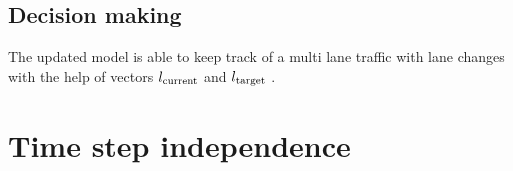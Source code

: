 		\subsection*{Decision making}
		The updated model is able to keep track of a multi lane traffic with lane changes with the help of vectors $l_{\rm current}$ and $l_{\rm target}$ .
	\section{Time step independence}